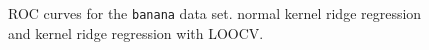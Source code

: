 \documentclass[a4paper, 11pt, titlepage]{article}
\begin{document}
\begin{figure}
	\centering
	\caption{ROC curves for the \texttt{banana} data set. \protect{} normal kernel ridge regression and \protect{} kernel ridge regression with LOOCV.}
	\label{fig:banana}
\end{figure}
\end{document}
